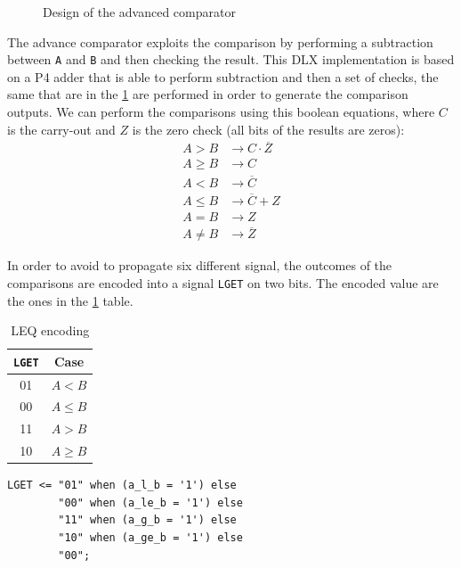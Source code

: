 \begin{figure}[H]
\begin{minipage}{.5\textwidth}
		\caption{Design of the advanced comparator}
		\label{comparator_advanced}
	\end{minipage}
\end{figure}

The advance comparator exploits the comparison by performing a subtraction between \texttt{A} and \texttt{B} and then checking the result. This DLX implementation is based on a P4 adder that is able to perform subtraction and then a set of checks, the same that are in the \ref{comparator_advanced} are performed in order to generate the comparison outputs. We can perform the comparisons using this boolean equations, where $C$ is the carry-out and $Z$ is the zero check (all bits of the results are zeros):
\begin{align*}
	A > B &\rightarrow C \cdot \overline{Z}\\
	A \geq B &\rightarrow C\\
	A < B  &\rightarrow \overline{C}\\
	A \leq B &\rightarrow \overline{C} + Z\\
	A = B &\rightarrow Z\\
	A \neq B  &\rightarrow \overline{Z} 
\end{align*}

 In order to avoid to propagate six different signal, the outcomes of the comparisons are encoded into a signal \texttt{LGET} on two bits. The encoded value are the ones in the \ref{tab:lget} table.
 \begin{multicols}{2}
 	\begin{table}[H]
 		\begin{center}
 			\begin{tabular}{ c| c}
 				\texttt{LGET} & Case\\
 				\hline
 				01 & $A < B$ \\
 				00 & $A \leq B$ \\
 				11 & $A > B$ \\
 				10 & $A \geq B$
 				
 			\end{tabular}
 			\caption{LEQ encoding}
 			\label{tab:lget}
 		\end{center}
 	\end{table}
 	
 	\columnbreak
 	
 	\begin{lstlisting}[style=vhdl,caption={VHDL code for the encodig},label=lget_code]
 	LGET <= "01" when (a_l_b = '1') else
	 	"00" when (a_le_b = '1') else 
	 	"11" when (a_g_b = '1') else
	 	"10" when (a_ge_b = '1') else
	 	"00";
 	\end{lstlisting}
 \end{multicols}

